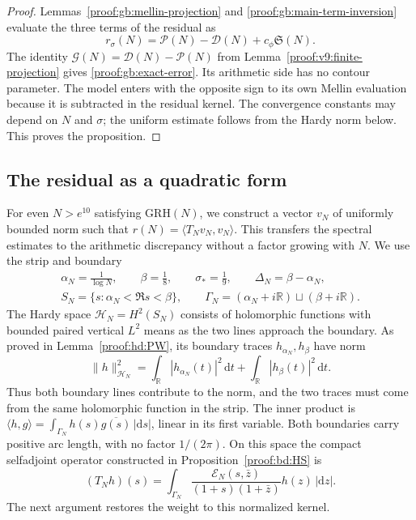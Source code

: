 \documentclass[12pt,a4paper]{amsart}
\numberwithin{equation}{section}
\theoremstyle{plain}
\theoremstyle{definition}
\theoremstyle{remark}
\begin{document}
\begin{proof}
Lemmas~\ref{proof:gb:mellin-projection} and \ref{proof:gb:main-term-inversion}
evaluate the three terms of the residual as
\[
 r_\sigma(N)=\mathcal P(N)-\mathcal D(N)+c_\phi\mathfrak S(N).
\]
The identity $\mathcal G(N)=\mathcal D(N)-\mathcal P(N)$ from
Lemma~\ref{proof:v9:finite-projection} gives
\eqref{proof:gb:exact-error}. Its arithmetic side has no contour parameter.
The model enters with the opposite sign to its own Mellin evaluation
because it is subtracted in the residual kernel.
The convergence constants may depend on $N$ and $\sigma$;
the uniform estimate follows from the Hardy norm below.
This proves the proposition.
\end{proof}

\subsection{The residual as a quadratic form}
\label{proof:detail:hardy-quadratic}

For even $N>e^{10}$ satisfying $\mathrm{GRH}(N)$, we construct a
vector $v_N$ of uniformly bounded norm such that
$r(N)=\langle T_Nv_N,v_N\rangle$. This transfers the spectral
estimates to the arithmetic discrepancy without a factor growing
with $N$. We use the strip and boundary
\[
 \begin{gathered}
 \alpha_N=\frac1{\log N},\qquad \beta=\frac18,\qquad
 \sigma_*=\frac19,\qquad \Delta_N=\beta-\alpha_N,\\
 S_N=\{s:\alpha_N<\Re s<\beta\},\qquad
 \Gamma_N=(\alpha_N+i\mathbb R)\sqcup(\beta+i\mathbb R).
 \end{gathered}
\]
The Hardy space $\mathcal H_N=H^2(S_N)$ consists of holomorphic
functions with bounded paired vertical $L^2$ means as the two lines
approach the boundary. As proved in Lemma~\ref{proof:hd:PW}, its
boundary traces $h_{\alpha_N},h_\beta$ have norm
\[
 \|h\|_{\mathcal H_N}^2
 =\int_{\mathbb R}|h_{\alpha_N}(t)|^2\,\mathrm{d}t
  +\int_{\mathbb R}|h_\beta(t)|^2\,\mathrm{d}t.
\]
Thus both boundary lines contribute to the norm, and the two traces
must come from the same holomorphic function in the strip. The
inner product is
$\langle h,g\rangle=\int_{\Gamma_N}h(s)\overline{g(s)}\,|\mathrm{d}s|$,
linear in its first variable. Both boundaries carry positive arc
length, with no factor $1/(2\pi)$. On this space the compact
selfadjoint operator constructed in Proposition~\ref{proof:bd:HS} is
\[
 (T_Nh)(s)=\int_{\Gamma_N}
     \frac{\mathscr E_N(s,\bar z)}{(1+s)(1+\bar z)}h(z)\,|\mathrm{d}z|.
\]
The next argument restores the weight to this normalized kernel.
\end{document}
